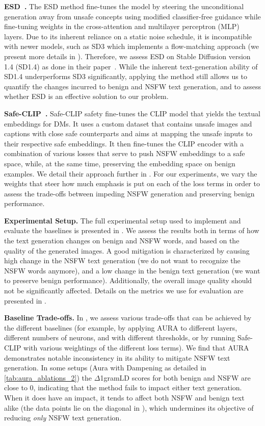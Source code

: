 \textbf{ESD~\citep{gandikota2023erasing}.} The ESD method fine-tunes the model by steering the unconditional generation away from unsafe concepts using modified classifier-free guidance while fine-tuning weights in the cross-attention and multilayer perceptron (MLP) layers. Due to its inherent reliance on a static noise schedule, it is incompatible with newer models, such as SD3 which implements a flow-matching approach (we present more details in ). Therefore, we assess ESD on Stable Diffusion version 1.4 (SD1.4) as done in their paper~\citep{gandikota2023erasing}. While the inherent text-generation ability of SD1.4 underperforms SD3 significantly, applying the method still allows us to quantify the changes incurred to benign and NSFW text generation, and to assess whether ESD is an effective solution to our problem. 

\textbf{Safe-CLIP~\citep{poppi2025safe}.} Safe-CLIP safety fine-tunes the CLIP model that yields the textual embeddings for DMs. It uses a custom dataset that contains unsafe images and captions with close safe counterparts and aims at mapping the unsafe inputs to their respective safe embeddings. It then fine-tunes the CLIP encoder with a combination of various losses that serve to push NSFW embeddings to a safe space, while, at the same time, preserving the embedding space on benign examples. We detail their approach further in .
For our experiments, we vary the weights that steer how much emphasis is put on each of the loss terms in order to assess the trade-offs between impeding NSFW generation and preserving benign performance.

\textbf{Experimental Setup.}
The full experimental setup used to implement and evaluate the baselines is presented in .
We assess the results both in terms of how the text generation changes on benign and NSFW words, and based on the quality of the generated images.
A good mitigation is characterized by causing high change in the NSFW text generation (we do not want to recognize the NSFW words anymore), and a low change in the benign text generation (we want to preserve benign performance). 
Additionally, the overall image quality should not be significantly affected.
Details on the metrics we use for evaluation are presented in .

\textbf{Baseline Trade-offs.}
In , we assess various trade-offs that can be achieved by the different baselines (for example, by applying AURA to different layers, different numbers of neurons, and with different thresholds, or by running Safe-CLIP with various weightings of the different loss terms).
We find that AURA demonstrates notable inconsistency in its ability to mitigate NSFW text generation. In some setups (Aura with Dampening as detailed in  \cref{tab:aura_ablations_2}) the $\Delta$1gramLD scores for both benign and NSFW are close to 0, indicating that the method fails to impact either text generation. When it does have an impact, it tends to affect both NSFW and benign text alike (the data points lie on the diagonal in ), which undermines its objective of reducing \textit{only} NSFW text generation. 

